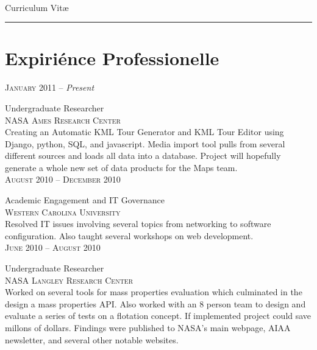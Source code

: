 \documentclass[10pt]{article}
\begin{document}
\color{text1} %

   \par{\\
      \color{headings} Curriculum  {Vit\ae}\\[25pt]\par
      {\color{white} \hrule}} %

\begin{minipage}[t]{0.5\textwidth} %

\vspace{0pt}   %

\section{Expiriénce Professionelle}
   \raggedleft
   \textsc{January 2011} -- \emph{Present}\par
   \raggedright\large Undergraduate Researcher\\
   \textsc{NASA Ames Research Center}\\
   \normalsize{Creating an Automatic KML Tour Generator and KML Tour Editor using Django, python, SQL, and javascript. Media import tool pulls from several different sources and loads all data into a database. Project will hopefully generate a whole new set of data products for the Maps team.}\\[5pt]

   \raggedleft
   \textsc{August 2010 -- December 2010}\par
   \raggedright\large Academic Engagement and IT Governance\\
   \textsc{Western Carolina University}\\
   \normalsize{Resolved IT issues involving several topics from networking to software configuration. Also taught several workshops on web development.}\\[5pt]

   \raggedleft
   \textsc{\normalsize June 2010 -- August 2010}\par
   \raggedright\large Undergraduate Researcher\\
   \textsc{NASA Langley Research Center}\\
   \normalsize{Worked on several tools for mass properties evaluation which culminated in the design a mass properties API. Also worked with an 8 person team to design and evaluate a series of tests on a flotation concept. If implemented project could save millons of dollars. Findings were published to NASA's main webpage, AIAA newsletter, and several other notable websites.}\\[5pt]


\end{minipage}
\end{document}
